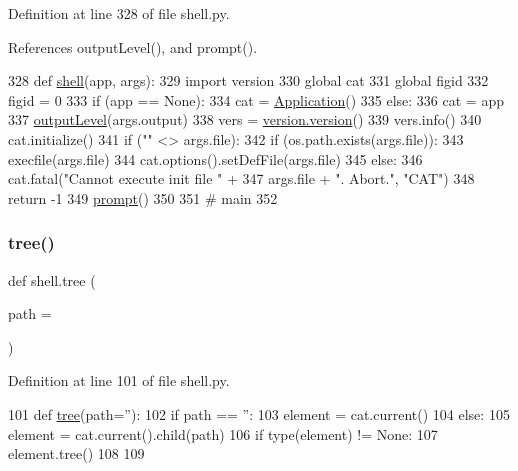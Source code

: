 Definition at line 328 of file shell.\+py.



References output\+Level(), and prompt().


\begin{DoxyCode}
328 \textcolor{keyword}{def }\hyperlink{namespaceshell_a95156c76dce36cfad6d1e2fcb85265ed}{shell}(app, args):
329   \textcolor{keyword}{import} version
330   \textcolor{keyword}{global} cat
331   \textcolor{keyword}{global} figid
332   figid = 0
333   \textcolor{keywordflow}{if} (app == \textcolor{keywordtype}{None}):
334     cat = \hyperlink{classApplication}{Application}()
335   \textcolor{keywordflow}{else}:
336     cat = app
337   \hyperlink{namespaceshell_ae17d022e61c0f8d61c3dee4f9bc68f51}{outputLevel}(args.output)
338   vers = \hyperlink{classversion_1_1version}{version.version}()
339   vers.info()
340   cat.initialize()
341   \textcolor{keywordflow}{if} (\textcolor{stringliteral}{""} <> args.file):
342     \textcolor{keywordflow}{if} (os.path.exists(args.file)):
343       execfile(args.file)
344       cat.options().setDefFile(args.file)
345     \textcolor{keywordflow}{else}:
346       cat.fatal(\textcolor{stringliteral}{"Cannot execute init file "} +
347                 args.file + \textcolor{stringliteral}{". Abort."}, \textcolor{stringliteral}{"CAT"})
348       \textcolor{keywordflow}{return} -1
349   \hyperlink{namespaceshell_af141a2fee68e5e84d8ac2cc51c3feedd}{prompt}()
350 
351 \textcolor{comment}{# main}
352 
\end{DoxyCode}
\mbox{\label{namespaceshell_aee4ac95f90c385c4fa8e9cd13ce2380d}} 
\subsubsection{\texorpdfstring{tree()}{tree()}}
{\footnotesize\ttfamily def shell.\+tree (\begin{DoxyParamCaption}\item[{}]{path = {\ttfamily \textquotesingle{}\textquotesingle{}} }\end{DoxyParamCaption})}



Definition at line 101 of file shell.\+py.


\begin{DoxyCode}
101 \textcolor{keyword}{def }\hyperlink{namespaceshell_aee4ac95f90c385c4fa8e9cd13ce2380d}{tree}(path=''):
102   \textcolor{keywordflow}{if} path == \textcolor{stringliteral}{''}:
103     element = cat.current()
104   \textcolor{keywordflow}{else}:
105     element = cat.current().child(path)
106   \textcolor{keywordflow}{if} type(element) != \textcolor{keywordtype}{None}:
107     element.tree()
108 
109 
\end{DoxyCode}
\mbox{\label{namespaceshell_aebe5a080b6d651f77ca73d69a425f126}} 

